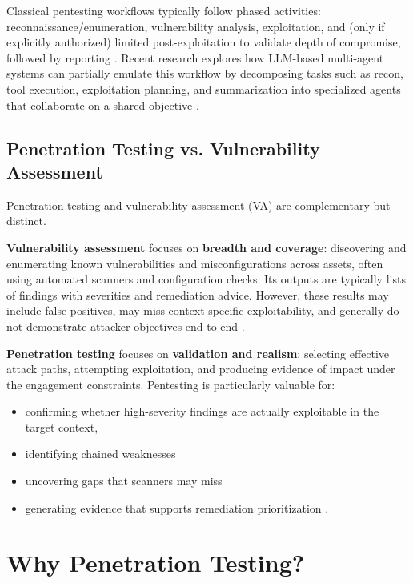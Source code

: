 Classical pentesting workflows typically follow phased activities: reconnaissance/enumeration, vulnerability analysis, exploitation,
and (only if explicitly authorized) limited post-exploitation to validate depth of compromise, followed by reporting
\cite{nistSP800115}. Recent research explores how LLM-based multi-agent systems can partially emulate this workflow by decomposing
tasks such as recon, tool execution, exploitation planning, and summarization into specialized agents that collaborate on a shared
objective \cite{vulnbot,aiPentestBenchmark,checkmate}.

\subsection{Penetration Testing vs. Vulnerability Assessment}
\label{subsubsec:ch1-pentest-vs-va}

Penetration testing and vulnerability assessment (VA) are complementary but distinct.

\textbf{Vulnerability assessment} focuses on \textbf{breadth and coverage}: discovering and enumerating known vulnerabilities and
misconfigurations across assets, often using automated scanners and configuration checks. Its outputs are typically lists of findings
with severities and remediation advice. However, these results may include false positives, may miss context-specific exploitability,
and generally do not demonstrate attacker objectives end-to-end \cite{nistSP800115}.

\textbf{Penetration testing} focuses on \textbf{validation and realism}: selecting effective attack paths, attempting exploitation,
and producing evidence of impact under the engagement constraints. Pentesting is particularly valuable for:
\begin{itemize}
  \item confirming whether high-severity findings are actually exploitable in the target context,
  \item identifying chained weaknesses
  \item uncovering gaps that scanners may miss
  \item generating evidence that supports remediation prioritization \cite{nistSP800115,doiPenTest}.
\end{itemize}

\section{Why Penetration Testing?}
\label{subsec:ch1-why}

